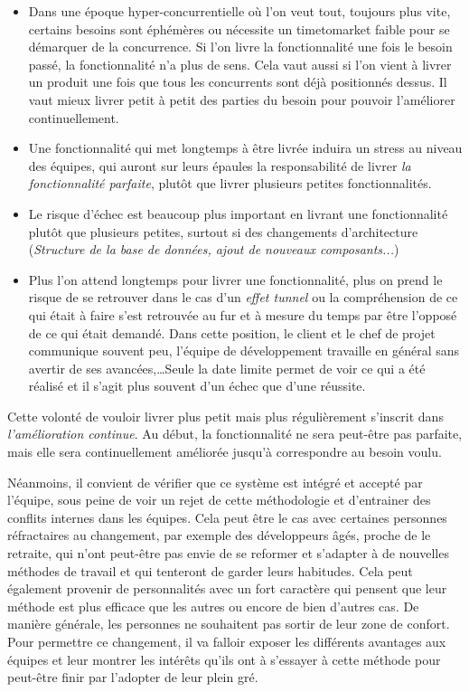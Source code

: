 \begin{itemize}
	\setlength\itemsep{0em}
	\item Dans une époque hyper-concurrentielle où l'on veut tout, toujours plus vite, certains besoins sont éphémères ou nécessite un \gls{timetomarket} faible pour se démarquer de la concurrence. Si l'on livre la fonctionnalité une fois le besoin passé, la fonctionnalité n'a plus de sens. Cela vaut aussi si l'on vient à livrer un produit une fois que tous les concurrents sont déjà positionnés dessus. Il vaut mieux livrer petit à petit des parties du besoin pour pouvoir l'améliorer continuellement.
	\item Une fonctionnalité qui met longtemps à être livrée induira un stress au niveau des équipes, qui auront sur leurs épaules la responsabilité de livrer \emph{la fonctionnalité parfaite}, plutôt que livrer plusieurs petites fonctionnalités.
	\item Le risque d'échec est beaucoup plus important en livrant une fonctionnalité plutôt que plusieurs petites, surtout si des changements d'architecture (\emph{Structure de la base de données, ajout de nouveaux composants...})
	\item Plus l'on attend longtemps pour livrer une fonctionnalité, plus on prend le risque de se retrouver dans le cas d'un \emph{effet tunnel} ou la compréhension de ce qui était à faire s'est retrouvée au fur et à mesure du temps par être l'opposé de ce qui était demandé. Dans cette position, le client et le chef de projet communique souvent peu, l'équipe de développement travaille en général sans avertir de ses avancées,\ldots Seule la date limite permet de voir ce qui a été réalisé et il s'agit plus souvent d'un échec que d'une réussite.
\end{itemize}

Cette volonté de vouloir livrer plus petit mais plus régulièrement s'inscrit dans \emph{l'amélioration continue}. Au début, la fonctionnalité ne sera peut-être pas parfaite, mais elle sera continuellement améliorée jusqu'à correspondre au besoin voulu. 


Néanmoins, il convient de vérifier que ce système est intégré et accepté par l'équipe, sous peine de voir un rejet de cette méthodologie et d'entrainer des conflits internes dans les équipes. Cela peut être le cas avec certaines personnes réfractaires au changement, par exemple des développeurs âgés, proche de le retraite, qui n'ont peut-être pas envie de se reformer et s'adapter à de nouvelles méthodes de travail et qui tenteront de garder leurs habitudes. Cela peut également provenir de personnalités avec un fort caractère qui pensent que leur méthode est plus efficace que les autres ou encore de bien d'autres cas. De manière générale, les personnes ne souhaitent pas sortir de leur zone de confort. Pour permettre ce changement, il va falloir exposer les différents avantages aux équipes et leur montrer les intérêts qu'ils ont à s'essayer à cette méthode pour peut-être finir par l'adopter de leur plein gré. 

